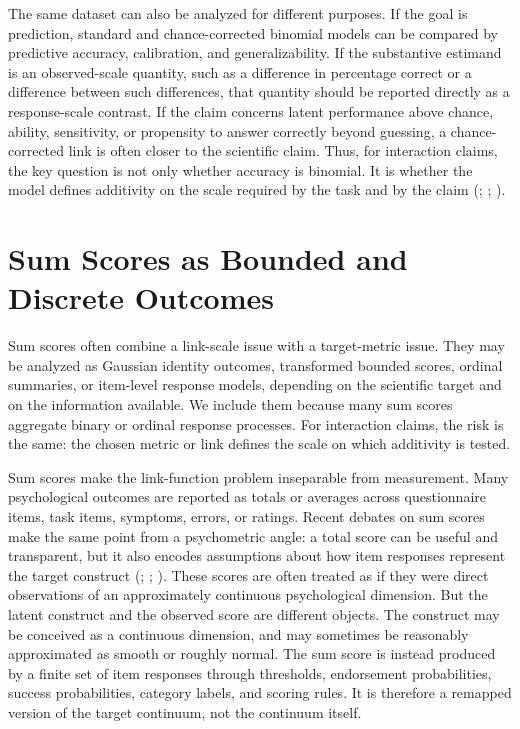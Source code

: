 \documentclass[
  man,
  longtable,
  nolmodern,
  notxfonts,
  notimes,
  colorlinks=true,linkcolor=blue,citecolor=blue,urlcolor=blue]{apa7}
\begin{document}
The same dataset can also be analyzed for different purposes. If the
goal is prediction, standard and chance-corrected binomial models can be
compared by predictive accuracy, calibration, and generalizability. If
the substantive estimand is an observed-scale quantity, such as a
difference in percentage correct or a difference between such
differences, that quantity should be reported directly as a
response-scale contrast. If the claim concerns latent performance above
chance, ability, sensitivity, or propensity to answer correctly beyond
guessing, a chance-corrected link is often closer to the scientific
claim. Thus, for interaction claims, the key question is not only
whether accuracy is binomial. It is whether the model defines additivity
on the scale required by the task and by the claim
(;
;
).

\section{Sum Scores as Bounded and Discrete
Outcomes}\label{sum-scores-as-bounded-and-discrete-outcomes}

Sum scores often combine a link-scale issue with a target-metric issue.
They may be analyzed as Gaussian identity outcomes, transformed bounded
scores, ordinal summaries, or item-level response models, depending on
the scientific target and on the information available. We include them
because many sum scores aggregate binary or ordinal response processes.
For interaction claims, the risk is the same: the chosen metric or link
defines the scale on which additivity is tested.

Sum scores make the link-function problem inseparable from measurement.
Many psychological outcomes are reported as totals or averages across
questionnaire items, task items, symptoms, errors, or ratings. Recent
debates on sum scores make the same point from a psychometric angle: a
total score can be useful and transparent, but it also encodes
assumptions about how item responses represent the target construct
(;
;
). These scores are
often treated as if they were direct observations of an approximately
continuous psychological dimension. But the latent construct and the
observed score are different objects. The construct may be conceived as
a continuous dimension, and may sometimes be reasonably approximated as
smooth or roughly normal. The sum score is instead produced by a finite
set of item responses through thresholds, endorsement probabilities,
success probabilities, category labels, and scoring rules. It is
therefore a remapped version of the target continuum, not the continuum
itself.
\end{document}
